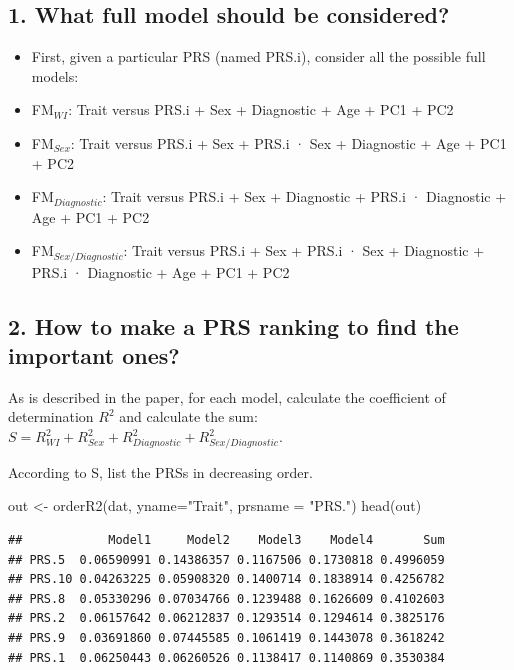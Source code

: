 \documentclass[
]{article}
\newenvironment{Shaded}{\begin{snugshade}}{\end{snugshade}}
\newcommand{\AttributeTok}[1]{\textcolor[rgb]{0.77,0.63,0.00}{#1}}
\newcommand{\FunctionTok}[1]{\textcolor[rgb]{0.00,0.00,0.00}{#1}}
\newcommand{\NormalTok}[1]{#1}
\newcommand{\OtherTok}[1]{\textcolor[rgb]{0.56,0.35,0.01}{#1}}
\newcommand{\StringTok}[1]{\textcolor[rgb]{0.31,0.60,0.02}{#1}}
\providecommand{\tightlist}{%
  \setlength{\itemsep}{0pt}\setlength{\parskip}{0pt}}
\begin{document}
\hypertarget{what-full-model-should-be-considered}{%
\subsection{1. What full model should be
considered?}\label{what-full-model-should-be-considered}}

\begin{itemize}
\tightlist
\item
  First, given a particular PRS (named PRS.i), consider all the possible
  full models:
\item
  FM\(_{WI}\): Trait versus PRS.i + Sex + Diagnostic + Age + PC1 + PC2
\item
  FM\(_{Sex}\): Trait versus PRS.i + Sex + PRS.i · Sex + Diagnostic +
  Age + PC1 + PC2
\item
  FM\(_{Diagnostic}\): Trait versus PRS.i + Sex + Diagnostic + PRS.i ·
  Diagnostic + Age + PC1 + PC2
\item
  FM\(_{Sex/Diagnostic}\): Trait versus PRS.i + Sex + PRS.i · Sex +
  Diagnostic + PRS.i · Diagnostic + Age + PC1 + PC2
\end{itemize}

\hypertarget{how-to-make-a-prs-ranking-to-find-the-important-ones}{%
\subsection{2. How to make a PRS ranking to find the important
ones?}\label{how-to-make-a-prs-ranking-to-find-the-important-ones}}

As is described in the paper, for each model, calculate the coefficient
of determination \(R^2\) and calculate the sum:
\(S = R^2_{WI} + R^2_{Sex} + R^2_{Diagnostic} + R^2_{Sex/Diagnostic}\).

According to S, list the PRSs in decreasing order.

\begin{Shaded}
\begin{Highlighting}[]
\NormalTok{out }\OtherTok{\textless{}{-}} \FunctionTok{orderR2}\NormalTok{(dat, }\AttributeTok{yname=}\StringTok{"Trait"}\NormalTok{, }\AttributeTok{prsname =} \StringTok{"PRS."}\NormalTok{)}
\FunctionTok{head}\NormalTok{(out)}
\end{Highlighting}
\end{Shaded}

\begin{verbatim}
##            Model1     Model2    Model3    Model4       Sum
## PRS.5  0.06590991 0.14386357 0.1167506 0.1730818 0.4996059
## PRS.10 0.04263225 0.05908320 0.1400714 0.1838914 0.4256782
## PRS.8  0.05330296 0.07034766 0.1239488 0.1626609 0.4102603
## PRS.2  0.06157642 0.06212837 0.1293514 0.1294614 0.3825176
## PRS.9  0.03691860 0.07445585 0.1061419 0.1443078 0.3618242
## PRS.1  0.06250443 0.06260526 0.1138417 0.1140869 0.3530384
\end{verbatim}
\end{document}
